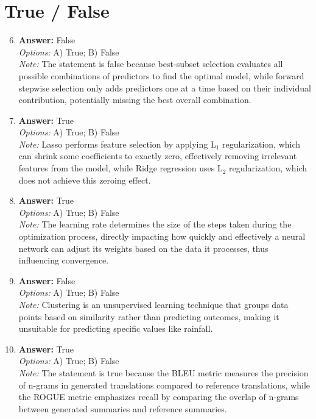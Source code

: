 \documentclass[12pt]{article}
\begin{document}
\section*{True / False}
\begin{enumerate}[label=\arabic*.]
\setcounter{enumi}{5}
\item \textbf{Answer:} False
\\ \textit{Options:} A) True; B) False
\\ \textit{Note:} The statement is false because best-subset selection evaluates all possible combinations of predictors to find the optimal model, while forward stepwise selection only adds predictors one at a time based on their individual contribution, potentially missing the best overall combination.
\item \textbf{Answer:} True
\\ \textit{Options:} A) True; B) False
\\ \textit{Note:} Lasso performs feature selection by applying L$_{1}$ regularization, which can shrink some coefficients to exactly zero, effectively removing irrelevant features from the model, while Ridge regression uses L$_{2}$ regularization, which does not achieve this zeroing effect.
\item \textbf{Answer:} True
\\ \textit{Options:} A) True; B) False
\\ \textit{Note:} The learning rate determines the size of the steps taken during the optimization process, directly impacting how quickly and effectively a neural network can adjust its weights based on the data it processes, thus influencing convergence.
\item \textbf{Answer:} False
\\ \textit{Options:} A) True; B) False
\\ \textit{Note:} Clustering is an unsupervised learning technique that groups data points based on similarity rather than predicting outcomes, making it unsuitable for predicting specific values like rainfall.
\item \textbf{Answer:} True
\\ \textit{Options:} A) True; B) False
\\ \textit{Note:} The statement is true because the BLEU metric measures the precision of n-grams in generated translations compared to reference translations, while the ROGUE metric emphasizes recall by comparing the overlap of n-grams between generated summaries and reference summaries.
\end{enumerate}
\end{document}
